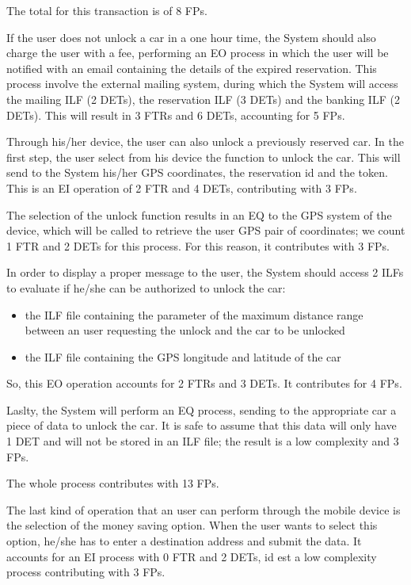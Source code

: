 The total for this transaction is of 8 FPs.
\bigskip

If the user does not unlock a car in a one hour time, the System should also charge the user with a fee, performing an EO process in which the user will be notified with an email containing the details of the expired reservation. This process involve the external mailing system, during which the System will access the mailing ILF (2 DETs), the reservation ILF (3 DETs) and the banking ILF (2 DETs). This will result in 3 FTRs and 6 DETs, accounting for 5 FPs.
\bigskip

Through his/her device, the user can also unlock a previously reserved car. 
In the first step, the user select from his device the function to unlock the car. This will send to the System his/her GPS coordinates, the reservation id and the token. This is an EI operation of 2 FTR and 4 DETs, contributing with 3 FPs.

The selection of the unlock function results in an EQ to the GPS system of the device, which will be called to retrieve the user GPS pair of coordinates; we count 1 FTR and 2 DETs for this process. For this reason, it contributes with 3 FPs.

In order to display a proper message to the user, the System should access 2 ILFs to evaluate if he/she can be authorized to unlock the car:
\begin{itemize}
	\item the ILF file containing the parameter of the maximum distance range between an user requesting the unlock and the car to be unlocked
	\item the ILF file containing the GPS longitude and latitude of the car
\end{itemize}
So, this EO operation accounts for 2 FTRs and 3 DETs. It contributes for 4 FPs.

Laslty, the System will perform an EQ process, sending to the appropriate car a piece of data to unlock the car. It is safe to assume that this data will only have 1 DET and will not be stored in an ILF file; the result is a low complexity and 3 FPs.

The whole process contributes with 13 FPs.
\bigskip

The last kind of operation that an user can perform through the mobile device is the selection of the money saving option.
When the user wants to select this option, he/she has to enter a destination address and submit the data. It accounts for an EI process with 0 FTR and 2 DETs, id est a low complexity process contributing with 3 FPs.

